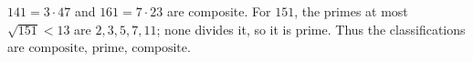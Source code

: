 $141=3\cdot47$ and $161=7\cdot23$ are composite. For $151$, the primes at most $\sqrt{151}<13$ are $2,3,5,7,11$; none divides it, so it is prime. Thus the classifications are $\boxed{\text{composite, prime, composite}}$.
